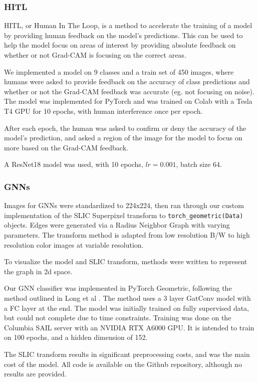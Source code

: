 \documentclass{article}
\begin{document}
\subsubsection{HITL}

HITL, or Human In The Loop, is a method to accelerate the training of a model by providing human feedback on the model's predictions. This can be used to help the model focus on areas of interest by providing absolute feedback on whether or not Grad-CAM is focusing on the correct areas.

We implemented a model on 9 classes and a train set of 450 images, where humans were asked to provide feedback on the accuracy of class predictions and whether or not the Grad-CAM feedback was accurate (eg. not focusing on noise). The model was implemented for PyTorch and was trained on Colab with a Tesla T4 GPU for 10 epochs, with human interference once per epoch. 

After each epoch, the human was asked to confirm or deny the accuracy of the model's prediction, and asked a region of the image for the model to focus on more based on the Grad-CAM feedback.

A ResNet18 model was used, with 10 epochs, $lr=0.001$, batch size 64. 

\subsubsection{GNNs}

Images for GNNs were standardized to 224x224, then ran through our custom implementation of the SLIC Superpixel transform to \verb*|torch_geometric(Data)| objects. Edges were generated via a Radius Neighbor Graph with varying parameters. The transform method is adapted from low resolution B/W to high resolution color images at variable resolution.

To visualize the model and SLIC transform, methods were written to represent the graph in 2d space.

Our GNN classifier was implemented in PyTorch Geometric, following the method outlined in Long et al \cite{long}. The method uses a 3 layer GatConv model with a FC layer at the end. The model was initially trained on fully supervised data, but could not complete due to time constraints. Training was done on the Columbia \@ SAIL server with an NVIDIA RTX A6000 GPU. It is intended to train on 100 epochs, and a hidden dimension of 152. 

The SLIC transform results in significant preprocessing costs, and was the main cost of the model. All code is available on the Github repository, although no results are provided.
\end{document}
